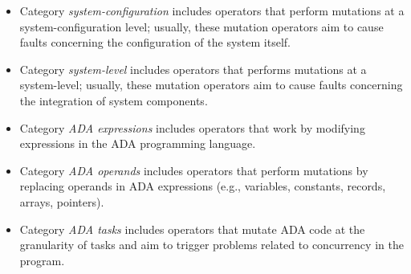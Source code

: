\begin{itemize}
\item Category \emph{system-configuration} includes operators that perform mutations at a system-configuration level; usually, these mutation operators aim to cause faults concerning the configuration of the system itself.
\item Category \emph{system-level} includes operators that performs mutations at a system-level; usually, these mutation operators aim to cause faults concerning the integration of system components. 
\item Category \emph{ADA expressions} includes operators that work by modifying expressions in the ADA programming language. 
\item Category \emph{ADA operands} includes operators that perform mutations by replacing operands in ADA expressions (e.g., variables, constants, records, arrays, pointers).
\item Category \emph{ADA tasks} includes operators that mutate ADA code at the granularity of tasks and aim to trigger problems related to concurrency in the program.
\end{itemize}


